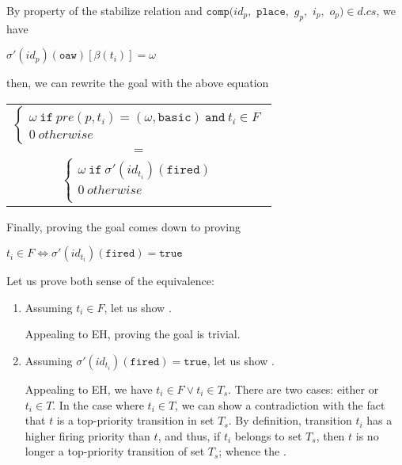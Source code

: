 \documentclass[dvipsnames,12pt]{article}
\begin{document}
\begin{niproof}
\begin{enumerate}
\begin{itemize}
\begin{itemize}
        By property of the stabilize relation and $\mathtt{comp}(id_p,$
        $\texttt{place},$ $g_p,$ $i_p,$ $o_p)\in{}d.cs$, we have
        \begin{center}
          $\sigma'(id_p)(\texttt{oaw})[\beta(t_i)]=\omega$
        \end{center}
        then, we can rewrite the goal with the above equation
        \begin{frameb}
          \begin{tabular}{c}
            $\begin{cases}
              \omega~\mathtt{if}~pre(p,t_i)=(\omega,\mathtt{basic})~\mathtt{and}~t_i\in{}F\\
              0~otherwise
            \end{cases}$ \\
            $=$ \\
            $\begin{cases}
              \omega~\mathtt{if}~\sigma'(id_{t_i})(\texttt{fired})\\
              0~otherwise\\
            \end{cases}$ \\
          \end{tabular}
        \end{frameb}

        Finally, proving the goal comes down to proving
        \begin{frameb}
          $t_i\in{}F\Leftrightarrow\sigma'(id_{t_i})(\texttt{fired})=\mathtt{true}$
        \end{frameb}

        Let us prove both sense of the equivalence:
        
        \begin{enumerate}
        \item Assuming $t_i\in{}F$, let us show
          .

          Appealing to EH, proving the goal is trivial.
          
        \item Assuming
          $\sigma'(id_{t_i})(\texttt{fired})=\mathtt{true}$, let us
          show .

          Appealing to EH, we have $t_i\in{}F\lor{}t_i\in{}T_s$. There
          are two cases: either  or $t_i\in{}T$.
          In the case where $t_i\in{}T$, we can show a contradiction
          with the fact that $t$ is a top-priority transition in set
          $T_s$. By definition, transition $t_i$ has a higher firing
          priority than $t$, and thus, if $t_i$ belongs to set $T_s$,
          then $t$ is no longer a top-priority transition of set
          $T_s$; whence the .
        \end{enumerate}
      \end{itemize}
    \end{itemize}
    

\end{enumerate}
\end{niproof}
\end{document}
